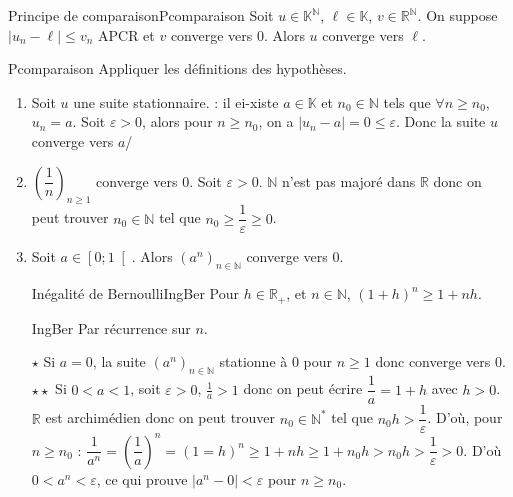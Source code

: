 \documentclass[12pt,a4paper]{report}
\begin{document}
\begin{remarque}[Remarques]
\begin{enumerate}
\begin{theoreme}{Principe de comparaison}{Pcomparaison}
Soit $u \in \mathbb{K}^\mathbb{N}$, $\ell \in \mathbb{K}$, $v \in \mathbb{R}^\mathbb{N}$. On suppose $\lvert u_n -\ell \rvert \leq v_n$ APCR et $v$ converge vers $0$. Alors $u$ converge vers $\ell$.
\end{theoreme}
\begin{principedemo}{Pcomparaison}
Appliquer les définitions des hypothèses.
\end{principedemo} 
\end{enumerate}
\end{remarque}


\begin{exemple}[Exemples]
\begin{enumerate}
\item Soit $u$ une suite stationnaire. : il ei-xiste $a \in \mathbb{K}$ et $n_0 \in \mathbb{N}$ tels que $\forall n \geq n_0$, $u_n=a$.
\newline Soit $\varepsilon > 0$, alors pour $n \geq n_0$, on a $\lvert u_n - a \rvert = 0 \leq \varepsilon$. Donc la suite $u$ converge vers $a$/
\item $\left(\dfrac{1}{n}\right)_{n \geq 1}$ converge vers 0. 
\newline Soit $\varepsilon > 0$. $\mathbb{N}$ n'est pas majoré dans $\mathbb{R}$ donc on peut trouver $n_0 \in \mathbb{N}$ tel que $n_0 \geq \dfrac{1}{\varepsilon} \geq 0$.
\item Soit $a \in \left[0 ; 1 \right[$. Alors $(a^n)_{n \in \mathbb{N}}$ converge vers $0$.
\begin{proposition}{Inégalité de Bernoulli}{IngBer}
Pour $h \in \mathbb{R}_+$, et $n \in \mathbb{N}$, $(1+h)^n \geq 1+nh$.
\end{proposition}
\begin{principedemo}{IngBer}
Par récurrence sur $n$.
\end{principedemo}

$\star$ \; Si $a=0$, la suite $(a^n)_{n \in \mathbb{N}}$ stationne à $0$ pour $n \geq 1$ donc converge vers $0$.
\newline $\star \star$ Si $0 < a < 1$, soit $\varepsilon > 0$, $\frac{1}{a} > 1$ donc on peut écrire $\dfrac{1}{a} = 1+h$ avec $h>0$.
\newline $\mathbb{R}$ est archimédien donc on peut trouver $n_0 \in \mathbb{N}^*$ tel que $n_0h > \dfrac{1}{\varepsilon}$. D'où, pour $n \geq n_0$ :
\newline $\dfrac{1}{a^n} = \left(\dfrac{1}{a}\right)^n = (1=h)^n \geq 1+nh \geq 1+n_0h > n_0h > \dfrac{1}{\varepsilon} > 0$.
\newline D'où $0 < a^n < \varepsilon$, ce qui prouve $\lvert a^n - 0 \rvert < \varepsilon$ pour $n \geq n_0$.


\end{enumerate}
\end{exemple}
\end{document}

